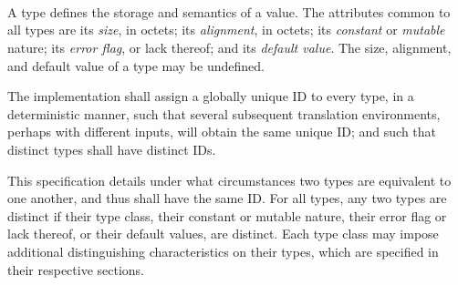 
\begin{grammar}

 \\
	 \optional{\terminal{!}}  \\

 \\
	 \\
	 \\
	 \\
	 \\
	 \\
	 \\
	 \\
	 \\
	 \\

 \\
	 \\
	 \\
	 \\
	 \\
	 \\
	 \\
	 \\
\end{grammar}

\specsubitem
A type defines the storage and semantics of a value. The attributes common to
all types are its \textit{size}, in octets; its \textit{alignment}, in octets;
its \textit{constant} or \textit{mutable} nature; its \textit{error flag}, or
lack thereof; and its \textit{default value}. The size, alignment, and default
value of a type may be undefined.

\specsubitem
The implementation shall assign a globally unique ID to every type, in a
deterministic manner, such that several subsequent translation environments,
perhaps with different inputs, will obtain the same unique ID; and such that
distinct types shall have distinct IDs.

This specification details under what circumstances two types are equivalent to
one another, and thus shall have the same ID. For all types, any two types are
distinct if their type class, their constant or mutable nature, their error
flag or lack thereof, or their default values, are distinct. Each type class
may impose additional distinguishing characteristics on their types, which are
specified in their respective sections.

